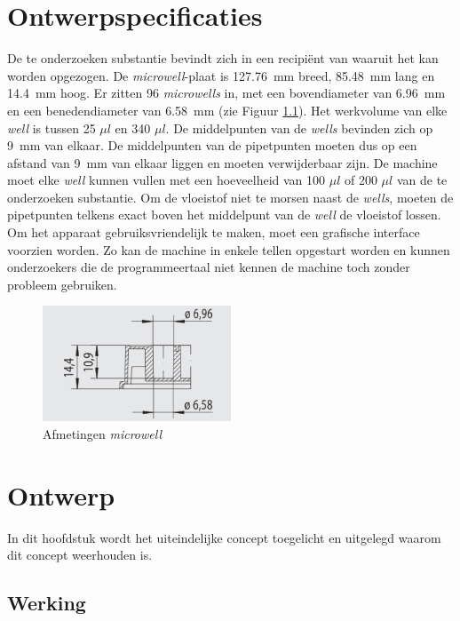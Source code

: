 \documentclass[a4paper,twoside,kulak]{kulakreport} %
\begin{document}
\chapter{Ontwerpspecificaties}
De te onderzoeken substantie bevindt zich in een recipiënt van waaruit het kan worden opgezogen. De \textit{microwell}-plaat is \SI{127.76}{mm} breed, \SI{85.48}{mm} lang en \SI{14.4}{mm} hoog. Er zitten 96 \textit{microwells} in, met een bovendiameter van \SI{6.96}{mm} en een benedendiameter van \SI{6.58}{mm} (zie Figuur \ref{fig: afmetingenMicrowellplaat}). Het werkvolume van elke \textit{well} is tussen 25 $\mu l$ en 340 $\mu l$. De middelpunten van de \textit{wells} bevinden zich op \SI{9}{mm} van elkaar. De middelpunten van de pipetpunten moeten dus op een afstand van \SI{9}{mm} van elkaar liggen en moeten verwijderbaar zijn. De machine moet elke \textit{well} kunnen vullen met een hoeveelheid van 100 $\mu l$ of 200 $\mu l$ van de te onderzoeken substantie. Om de vloeistof niet te morsen naast de \textit{wells}, moeten de pipetpunten telkens exact boven het middelpunt van de \textit{well} de vloeistof lossen. Om het apparaat gebruiksvriendelijk te maken, moet een grafische interface voorzien worden. Zo kan de machine in enkele tellen opgestart worden en kunnen onderzoekers die de programmeertaal niet kennen de machine toch zonder probleem gebruiken.

\begin{figure}[h]
	\centering
	\includegraphics[width=0.5\textwidth]{AfmetingenMicrowell.png}
	\caption{Afmetingen \textit{microwell}}
	\label{fig: afmetingenMicrowellplaat}
	
\end{figure} 


\chapter{Ontwerp} 


In dit hoofdstuk wordt het uiteindelijke concept toegelicht en uitgelegd waarom dit concept weerhouden is.

\section{Werking}
\end{document}
